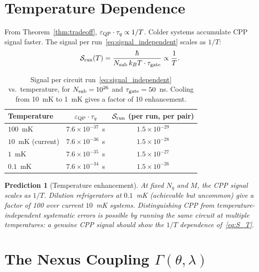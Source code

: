 \documentclass[11pt,letterpaper]{article}
\newtheorem{prediction}[theorem]{Prediction}
\newcommand{\eps}{\varepsilon}
\begin{document}
\section{Temperature Dependence}
\label{sec:temperature}

From Theorem~\ref{thm:tradeoff}, $\eps_{\rm QP} \cdot \tau_q
\propto 1/T$.  Colder systems accumulate CPP signal faster.
The signal per run~\eqref{eq:signal_independent} scales as $1/T$:
\begin{equation}
\mathcal{S}_{\rm run}(T) = \frac{\hbar}{N_{\rm sub}\, k_B T
  \cdot \tau_{\rm gate}} \propto \frac{1}{T}.
\label{eq:S_T}
\end{equation}

\begin{table}[H]
\centering
\caption{Signal per circuit run~\eqref{eq:signal_independent} vs.\
  temperature, for $N_{\rm sub} = 10^{26}$ and
  $\tau_{\rm gate} = 50$~ns.  Cooling from 10~mK to 1~mK gives
  a factor of 10 enhancement.}
\label{tab:signal_T}
\begin{tabular}{@{}lcc@{}}
\toprule
Temperature & $\eps_{\rm QP}\cdot\tau_q$ & $\mathcal{S}_{\rm run}$
  (per run, per pair) \\
\midrule
$100$~mK & $7.6\times10^{-37}$~s & $1.5\times10^{-29}$ \\
$10$~mK (current) & $7.6\times10^{-36}$~s & $1.5\times10^{-28}$ \\
$1$~mK & $7.6\times10^{-35}$~s & $1.5\times10^{-27}$ \\
$0.1$~mK & $7.6\times10^{-34}$~s & $1.5\times10^{-26}$ \\
\bottomrule
\end{tabular}
\end{table}

\begin{prediction}[Temperature enhancement]
\label{pred:temperature}
At fixed $N_q$ and $M$, the CPP signal scales as $1/T$.
Dilution refrigerators at $0.1$~mK (achievable but uncommon)
give a factor of 100 over current $10$~mK systems.
Distinguishing CPP from temperature-independent systematic errors
is possible by running the same circuit at multiple temperatures:
a genuine CPP signal should show the $1/T$ dependence of~\eqref{eq:S_T}.
\end{prediction}

\section{The Nexus Coupling $\Gamma(\theta, \lambda)$}
\label{sec:nexus_coupling}
\end{document}

